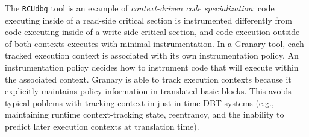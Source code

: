 \documentclass[preprint]{sigplanconf}
\begin{document}
The \texttt{RCUdbg} tool is an example of \emph{context-driven code specialization}: code executing inside of a read-side critical section is instrumented differently from code executing inside of a write-side critical section, and code execution outside of both contexts executes with minimal instrumentation. In a Granary tool, each tracked execution context is associated with its own instrumentation policy. An instrumentation policy decides how to instrument code that will execute within the associated context. Granary is able to track execution contexts because it explicitly maintains policy information in translated basic blocks. This avoids typical poblems with tracking context in just-in-time DBT systems (e.g., maintaining runtime context-tracking state, reentrancy, and the inability to predict later execution contexts at translation time).


\end{document}

